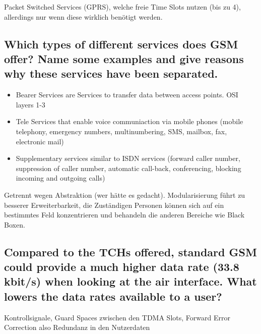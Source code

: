 Packet Switched Services (GPRS), welche freie Time Slots nutzen (bis zu 4), allerdings nur wenn diese wirklich benötigt werden.

\subsection{Which types of different services does GSM offer? Name some examples and give reasons why these services have been separated.}
\begin{itemize}
\item Bearer Services are Services to transfer data between access points. OSI layers 1-3

\item Tele Services that enable voice communiaction via mobile phones (mobile telephony, emergency numbers, multinumbering, SMS, mailbox, fax, electronic mail)

\item Supplementary services similar to ISDN services (forward caller number, suppression of caller number, automatic call-back, conferencing, blocking incoming and outgoing calls)
\end{itemize}

Getrennt wegen Abstraktion (wer hätte es gedacht). Modularisierung führt zu besserer Erweiterbarkeit, die Zuständigen Personen können sich auf ein bestimmtes Feld konzentrieren und behandeln die anderen Bereiche wie Black Boxen.


\subsection{Compared to the TCHs offered, standard GSM could provide a much higher data rate (33.8 kbit/s) when looking at the air interface. What lowers the data rates available to a user?}
Kontrollsignale, Guard Spaces zwischen den TDMA Slots, Forward Error Correction also Redundanz in den Nutzerdaten

